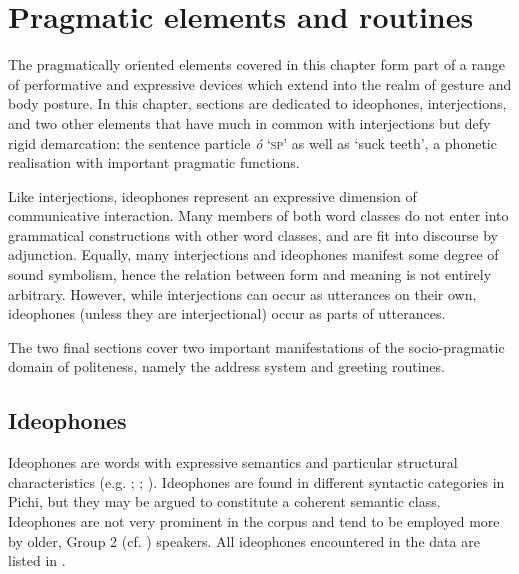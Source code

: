 \chapter{Pragmatic elements and routines}

The pragmatically oriented elements covered in this chapter form part of a range of performative and expressive devices which extend into the realm of gesture and body posture. In this chapter, sections are dedicated to ideophones, interjections, and two other elements that have much in common with interjections but defy rigid demarcation: the sentence particle \textit{ó} ‘\textsc{sp}’ as well as ‘suck teeth’, a phonetic realisation with important pragmatic functions. 


Like interjections, ideophones represent an expressive dimension of communicative interaction. Many members of both word classes do not enter into grammatical constructions with other word classes, and are fit into discourse by adjunction. Equally, many interjections and ideophones manifest some degree of sound symbolism, hence the relation between form and meaning is not entirely arbitrary. However, while interjections can occur as utterances on their own, ideophones (unless they are interjectional) occur as parts of utterances. 


The two final sections cover two important manifestations of the socio-pragmatic domain of politeness, namely the address system and greeting routines. 


\section{Ideophones}\label{sec:12.1}

Ideophones are words with expressive semantics and particular structural characteristics (e.g. \citealt[187–189]{Westermann1930}; \citealt[118–119]{Doke1935}; \citealt{Dingemanse2017}). Ideophones are found in different syntactic categories in Pichi, but they may be argued to constitute a coherent semantic class. 
Ideophones are not very prominent in the corpus and tend to be employed more by older, Group 2 (cf. ) speakers. All ideophones encountered in the data are listed in . 



